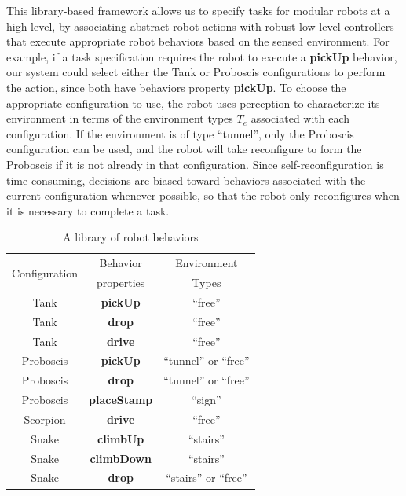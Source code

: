 \documentclass[conference]{IEEEtran}
\begin{document}
This library-based framework allows us to specify tasks for modular robots at a high level, by associating abstract robot actions with robust low-level controllers that execute appropriate robot behaviors based on the sensed environment. For example, if a task specification requires the robot to execute a \textbf{pickUp} behavior, our system could select either the Tank or Proboscis configurations to perform the action, since both have behaviors property \textbf{pickUp}. To choose the appropriate configuration to use, the robot uses perception to characterize its environment in terms of the environment types $T_e$ associated with each configuration. If the environment is of type ``tunnel'', only the Proboscis configuration can be used, and the robot will take  reconfigure to form the Proboscis if it is not already in that configuration. Since self-reconfiguration is time-consuming, decisions are biased toward behaviors associated with the current configuration whenever possible, so that the robot only reconfigures when it is necessary to complete a task.
%
\begin{table}
\centering
\begin{tabular}{ |c|c|c| } 
 \hline
 \multirow{2}{6em}{Configuration} & Behavior & Environment \\
 & properties & Types \\
 \hline
 Tank & \textbf{pickUp} & ``free'' \\\hline
 Tank & \textbf{drop} & ``free'' \\\hline
 Tank & \textbf{drive} & ``free''\\ \hline
 Proboscis & \textbf{pickUp} & ``tunnel'' or ``free''\\ \hline
 Proboscis & \textbf{drop} &``tunnel'' or ``free'' \\ \hline
 Proboscis & \textbf{placeStamp} & ``sign''\\ \hline
 Scorpion & \textbf{drive} & ``free''\\ \hline
 Snake & \textbf{climbUp} & ``stairs''\\ \hline
 Snake & \textbf{climbDown} & ``stairs''\\ \hline
 Snake & \textbf{drop} & ``stairs'' or ``free''\\
 \hline
\end{tabular}
\caption{A library of robot behaviors}
\label{table:1}
\vspace{-1em}
\end{table}

\end{document}
